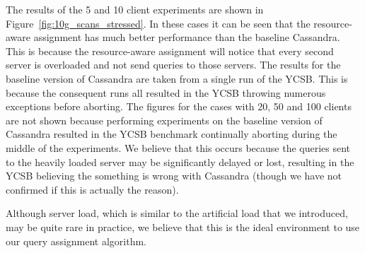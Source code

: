 The results of the 5 and 10 client experiments are shown in Figure~\ref{fig:10g_scans_stressed}. In these cases it can be seen that the resource-aware assignment has much better performance than the baseline Cassandra. This is because the resource-aware assignment will notice that every second server is overloaded and not send queries to those servers. The results for the baseline version of Cassandra are taken from a single run of the YCSB. This is because the consequent runs all resulted in the YCSB throwing numerous exceptions before aborting. The figures for the cases with 20, 50 and 100 clients are not shown because performing experiments on the baseline version of Cassandra resulted in the YCSB benchmark continually aborting during the middle of the experiments. We believe that this occurs because the queries sent to the heavily loaded server may be significantly delayed or lost, resulting in the YCSB believing the something is wrong with Cassandra (though we have not confirmed if this is actually the reason).

Although server load, which is similar to the artificial load that we introduced, may be quite rare in practice, we believe that this is the ideal environment to use our query assignment algorithm.